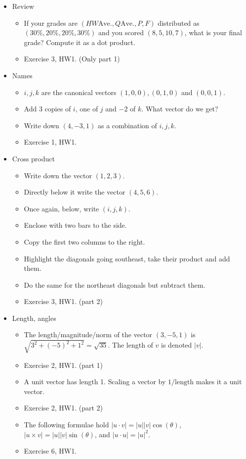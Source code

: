 \documentclass{standalone}
\begin{document}
\begin{itemize}
  \item Review
  \begin{itemize}
    \item If your grades are $(HW\text{Ave.},Q\text{Ave.},P,F)$ distributed as $(30\%,20\%,20\%,30\%)$ and you scored $(8,5,10,7)$, what is your final grade? Compute it as a dot product.
    \item Exercise 3, HW1. (Only part 1)
  \end{itemize}
  \item Names
  \begin{itemize}
    \item $i,j,k$ are the canonical vectors $(1,0,0),(0,1,0)$ and $(0,0,1)$.
    \item Add 3 copies of $i$, one of $j$ and $-2$ of $k$. What vector do we get?
    \item Write down $(4,-3,1)$ as a combination of $i,j,k$.
    \item Exercise 1, HW1.
  \end{itemize}
  \item Cross product
  \begin{itemize}
    \item Write down the vector $(1,2,3)$.
    \item Directly below it write the vector $(4,5,6)$.
    \item Once again, below, write $(i,j,k)$.
    \item Enclose with two bars to the side.
    \item Copy the first two columns to the right.
    \item Highlight the diagonals going southeast, take their product and add them.
    \item Do the same for the northeast diagonals but subtract them.
    \item Exercise 3, HW1. (part 2)
  \end{itemize}
  \item Length, angles
  \begin{itemize}
        \item The length/magnitude/norm of the vector $(3,-5,1)$ is $\sqrt{3^2+(-5)^2+1^2}=\sqrt{35}$. The length of $v$ is denoted $|v|$.
        \item Exercise 2, HW1. (part 1)
        \item A unit vector has length 1. Scaling a vector by $1/\text{length}$ makes it a unit vector.
        \item Exercise 2, HW1. (part 2)
        \item The following formulae hold $|u\cdot v|=|u||v|\cos(\theta)$, $|u\times v|=|u||v|\sin(\theta)$, and $|u\cdot u|=|u|^2$.
        \item Exercise 6, HW1.
  \end{itemize}
\end{itemize}
\end{document}
